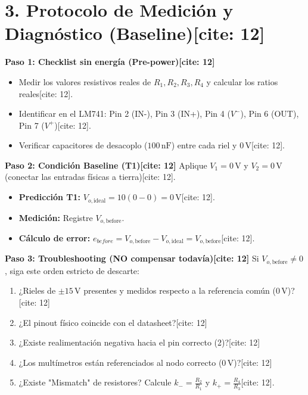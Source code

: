 \documentclass[11pt, a4paper]{article}
\begin{document}
\section*{3. Protocolo de Medición y Diagnóstico (Baseline)[cite: 12]}
\textbf{Paso 1: Checklist sin energía (Pre-power)[cite: 12]}
\begin{itemize}
    \item Medir los valores resistivos reales de $R_1, R_2, R_3, R_4$ y calcular los ratios reales[cite: 12].
    \item Identificar en el LM741: Pin 2 (IN-), Pin 3 (IN+), Pin 4 ($V^-$), Pin 6 (OUT), Pin 7 ($V^+$)[cite: 12].
    \item Verificar capacitores de desacoplo ($100\,\text{nF}$) entre cada riel y $0\,\text{V}$[cite: 12].
\end{itemize}

\textbf{Paso 2: Condición Baseline (T1)[cite: 12]}
Aplique $V_1 = 0\,\text{V}$ y $V_2 = 0\,\text{V}$ (conectar las entradas físicas a tierra)[cite: 12].
\begin{itemize}
    \item \textbf{Predicción T1:} $V_{o,\mathrm{ideal}} = 10(0 - 0) = 0\,\text{V}$[cite: 12].
    \item \textbf{Medición:} Registre $V_{o,\mathrm{before}}$.
    \item \textbf{Cálculo de error:} $e_{before} = V_{o,\mathrm{before}} - V_{o,\mathrm{ideal}} = V_{o,\mathrm{before}}$[cite: 12].
\end{itemize}

\textbf{Paso 3: Troubleshooting (NO compensar todavía)[cite: 12]}
Si $V_{o,\mathrm{before}} \neq 0$, siga este orden estricto de descarte:
\begin{enumerate}
    \item ¿Rieles de $\pm15\,\text{V}$ presentes y medidos respecto a la referencia común ($0\,\text{V}$)?[cite: 12]
    \item ¿El pinout físico coincide con el datasheet?[cite: 12]
    \item ¿Existe realimentación negativa hacia el pin correcto (2)?[cite: 12]
    \item ¿Los multímetros están referenciados al nodo correcto ($0\,\text{V}$)?[cite: 12]
    \item ¿Existe "Mismatch" de resistores? Calcule $k_- = \frac{R_2}{R_1}$ y $k_+ = \frac{R_4}{R_3}$[cite: 12].
\end{enumerate}
\end{document}
